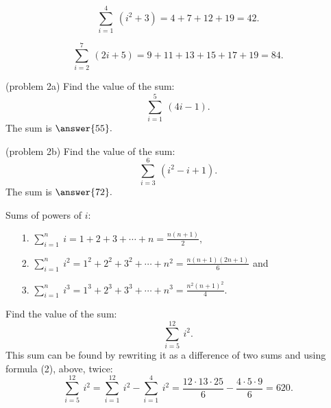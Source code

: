 \documentclass{ximera}
\begin{document}
\begin{example}[example1]
\[\sum_{i = 1}^4 \ (i^2 + 3) = 4 + 7 + 12 + 19 = 42.\]
\end{example}

\begin{example}[example 2]
\[\sum_{i = 2}^7 \ (2i +5) = 9 + 11 + 13 + 15 + 17 + 19 = 84.\]
\end{example}

\begin{problem}(problem 2a)
Find the value of the sum:
\[\sum_{i = 1}^5 \ (4i -1).\]
The sum is $\answer{55}.$
\end{problem}

\begin{problem}(problem 2b)
Find the value of the sum:
\[\sum_{i = 3}^6 \ (i^2 - i + 1).\]
The sum is $\answer{72}.$
\end{problem}


\begin{theorem} Sums of powers of $i$:



\begin{itemize}
\item[1.] $\displaystyle{\sum_{i = 1}^n \ i = 1 + 2 + 3+ \cdots + n = \frac{n(n+1)}{2}},$
\item[2.] $\displaystyle{\sum_{i = 1}^n \ i^2 = 1^2 + 2^2 + 3^2 + \cdots + n^2 = \frac{n(n+1)(2n+1)}{6}}$ and
\item[3.] $\displaystyle{\sum_{i = 1}^n \ i^3 = 1^3 + 2^3+ 3^3 + \cdots + n^3 = \frac{n^2(n+1)^2}{4}}$.
\end{itemize}
\end{theorem}

\begin{example}[example 3]
Find the value of the sum:
\[\sum_{i = 5}^{12} \ i^2.\]
This sum can be found by rewriting it as a difference of two sums and using formula (2), above, twice:
 \[\sum_{i = 5}^{12} \ i^2 = \sum_{i = 1}^{12}\ i^2 - \sum_{i = 1}^{4} \ i^2 = \frac{12\cdot 13\cdot 25}{6} - \frac{4\cdot 5\cdot 9}{6} = 620. \]
\end{example}
\end{document}
